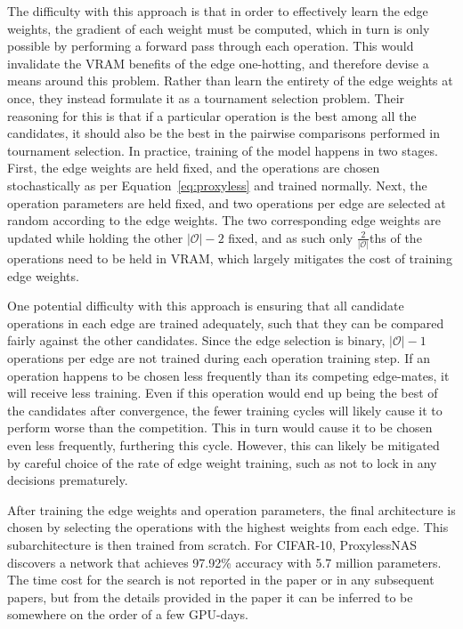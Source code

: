 The difficulty with this approach is that in order to effectively learn the edge weights, the gradient of each weight
must be computed, which in turn is only possible by performing a forward pass through each operation. This would invalidate
the VRAM benefits of the edge one-hotting, and therefore \citeauthor{cai2018} devise a means around this problem. Rather than
learn the entirety of the edge weights at once, they instead formulate it as a tournament selection problem. Their reasoning
for this is that if a particular operation is the best among all the candidates, it should also be the best in the pairwise
comparisons performed in tournament selection. In practice, training of the model happens in two stages. First, the edge
weights are held fixed, and the operations are chosen stochastically as per Equation~\ref{eq:proxyless} and trained normally.
Next, the operation parameters are held fixed, and two operations per edge are selected at random according to the
edge weights. The two corresponding edge weights are updated while holding the other $|\mathcal{O}|-2$ fixed, and as such
only $\frac{2}{\lvert \mathcal{O} \rvert}$ths of the operations need to be held in VRAM, which largely
mitigates the cost of training edge weights.

One potential difficulty with this approach is ensuring that all candidate operations in each edge are trained adequately,
such that they can be compared fairly against the other candidates. Since the edge selection is binary, $|\mathcal{O}|-1$
operations per edge are not trained during each operation training step. If an operation happens to be chosen less frequently
than its competing edge-mates, it will receive less training. Even if this operation would end up being the best of the
candidates after convergence, the fewer training cycles will likely cause it to perform worse than the competition. This in turn
would cause it to be chosen even less frequently, furthering this cycle. However, this can likely be mitigated by
careful choice of the rate of edge weight training, such as not to lock in any decisions prematurely.

After training the edge weights and operation parameters, the final architecture is chosen by selecting the operations
with the highest weights from each edge. This subarchitecture is then trained from scratch. For CIFAR-10, ProxylessNAS
discovers a network that achieves 97.92\% accuracy with 5.7 million parameters. The time cost for the search is not reported in the
paper or in any subsequent papers, but from the details provided in the paper it can be inferred to be somewhere on the
order of a few GPU-days.

